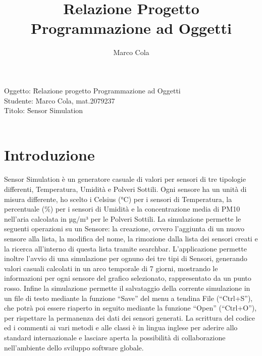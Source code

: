 \documentclass{article}
\title{Relazione Progetto Programmazione ad Oggetti}
\author{Marco Cola}
\date{}
\begin{document}
\maketitle

\begin{tabbing}
    Oggetto: \= Relazione progetto Programmazione ad Oggetti \\
    Studente:  \=  Marco Cola, mat.2079237 \\
    Titolo: \= Sensor Simulation \\
    \\
\end{tabbing}

\section{Introduzione}
Sensor Simulation è un generatore casuale di valori per sensori di tre tipologie differenti,
Temperatura, Umidità e Polveri Sottili. Ogni sensore ha un unità di misura differente, ho scelto i
Celsius (°C) per i sensori di Temperatura, la percentuale (\%) per i sensori di Umidità e la
concentrazione media di PM10 nell’aria calcolata in µg/m³ per le Polveri Sottili. La simulazione
permette le seguenti operazioni su un Sensore: la creazione, ovvero l’aggiunta di un nuovo sensore
alla lista, la modifica del nome, la rimozione dalla lista dei sensori creati e la ricerca all’interno di
questa lista tramite searchbar.
L’applicazione permette inoltre l’avvio di una simulazione per ognuno dei tre tipi di Sensori,
generando valori casuali calcolati in un arco temporale di 7 giorni, mostrando le informazioni per
ogni sensore del grafico selezionato, rappresentato da un punto rosso. Infine la simulazione permette il salvataggio della corrente simulazione in un file di testo mediante la funzione “Save” del menu a tendina File (“Ctrl+S”), che potrà poi essere riaperto in seguito mediante la funzione “Open” (“Ctrl+O”), per rispettare la permanenza dei dati dei sensori generati.
La scrittura del codice ed i commenti ai vari metodi e alle classi è in lingua inglese per aderire allo
standard internazionale e lasciare aperta la possibilità di collaborazione nell’ambiente dello
sviluppo software globale.
\end{document}
